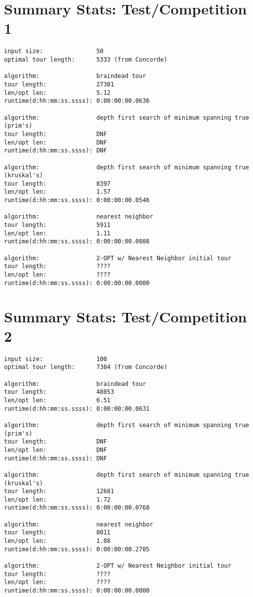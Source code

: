 \documentclass[12pt]{article}
\begin{document}
\newpage
\section*{Summary Stats: Test/Competition 1}
\begin{verbatim}
input size:               50
optimal tour length:      5333 (from Concorde)

algorithm:                braindead tour
tour length:              27301
len/opt len:              5.12
runtime(d:hh:mm:ss.ssss): 0:00:00:00.0636

algorithm:                depth first search of minimum spanning true (prim's) 
tour length:              DNF
len/opt len:              DNF
runtime(d:hh:mm:ss.ssss): DNF

algorithm:                depth first search of minimum spanning true (kruskal's) 
tour length:              8397
len/opt len:              1.57
runtime(d:hh:mm:ss.ssss): 0:00:00:00.0546

algorithm:                nearest neighbor 
tour length:              5911
len/opt len:              1.11
runtime(d:hh:mm:ss.ssss): 0:00:00:00.0808

algorithm:                2-OPT w/ Nearest Neighbor initial tour
tour length:              ????
len/opt len:              ????
runtime(d:hh:mm:ss.ssss): 0:00:00:00.0000
\end{verbatim}

\newpage
\section*{Summary Stats: Test/Competition 2}
\begin{verbatim}
input size:               100
optimal tour length:      7384 (from Concorde)

algorithm:                braindead tour
tour length:              48053
len/opt len:              6.51
runtime(d:hh:mm:ss.ssss): 0:00:00:00.0631

algorithm:                depth first search of minimum spanning true (prim's) 
tour length:              DNF
len/opt len:              DNF
runtime(d:hh:mm:ss.ssss): DNF

algorithm:                depth first search of minimum spanning true (kruskal's) 
tour length:              12681
len/opt len:              1.72
runtime(d:hh:mm:ss.ssss): 0:00:00:00.0768

algorithm:                nearest neighbor 
tour length:              8011
len/opt len:              1.08
runtime(d:hh:mm:ss.ssss): 0:00:00:00.2705

algorithm:                2-OPT w/ Nearest Neighbor initial tour
tour length:              ????
len/opt len:              ????
runtime(d:hh:mm:ss.ssss): 0:00:00:00.0000
\end{verbatim}
\end{document}
